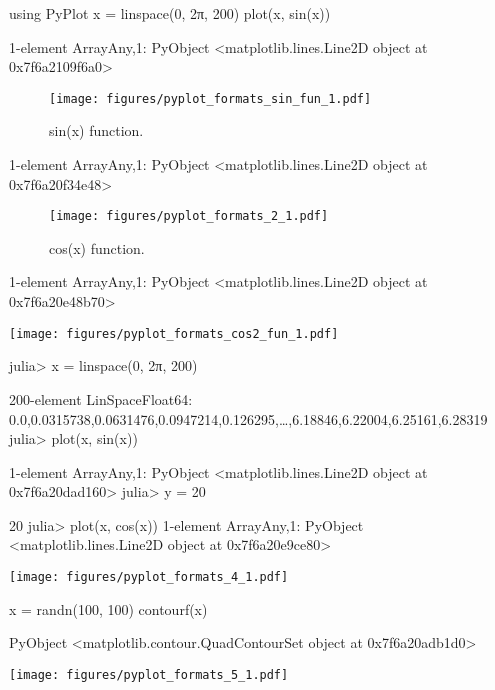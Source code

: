 



\begin{juliacode}
using PyPlot
x = linspace(0, 2π, 200)
plot(x, sin(x))
\end{juliacode}
\begin{juliaout}
1-element Array{Any,1}:
 PyObject <matplotlib.lines.Line2D object at 0x7f6a2109f6a0>
\end{juliaout}
\begin{figure}[ht]
\center
\texttt{[image: figures/pyplot\_formats\_sin\_fun\_1.pdf]}
\caption{sin(x) function.}
\label{fig:sin_fun}
\end{figure}



\begin{juliaout}
1-element Array{Any,1}:
 PyObject <matplotlib.lines.Line2D object at 0x7f6a20f34e48>
\end{juliaout}
\begin{figure}[htpb]
\center
\texttt{[image: figures/pyplot\_formats\_2\_1.pdf]}
\caption{cos(x) function.}
\end{figure}



\begin{juliaout}
1-element Array{Any,1}:
 PyObject <matplotlib.lines.Line2D object at 0x7f6a20e48b70>
\end{juliaout}
\texttt{[image: figures/pyplot\_formats\_cos2\_fun\_1.pdf]}



\begin{juliaterm}
julia> x = linspace(0, 2π, 200)

200-element LinSpace{Float64}:
 0.0,0.0315738,0.0631476,0.0947214,0.126295,…,6.18846,6.22004,6.25161,6.28319
julia> plot(x, sin(x))

1-element Array{Any,1}:
 PyObject <matplotlib.lines.Line2D object at 0x7f6a20dad160>
julia> y = 20

20
julia> plot(x, cos(x))
1-element Array{Any,1}:
 PyObject <matplotlib.lines.Line2D object at 0x7f6a20e9ce80>
\end{juliaterm}
\texttt{[image: figures/pyplot\_formats\_4\_1.pdf]}



\begin{juliacode}
x = randn(100, 100)
contourf(x)
\end{juliacode}
\begin{juliaout}
PyObject <matplotlib.contour.QuadContourSet object at 0x7f6a20adb1d0>
\end{juliaout}
\texttt{[image: figures/pyplot\_formats\_5\_1.pdf]}
